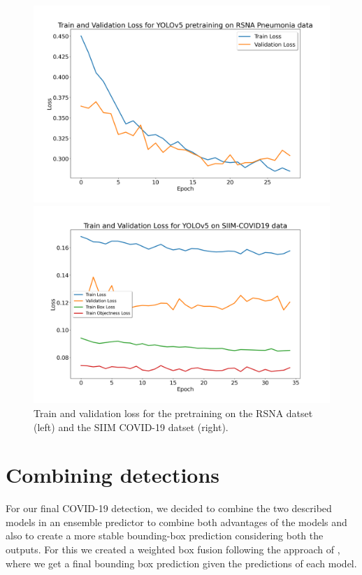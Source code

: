 \begin{figure}[h!]
	\centering
	\begin{minipage}{.5\textwidth}
		\centering
		\includegraphics[width=\linewidth]{img/loss_yolo_30.png}
	\end{minipage}%
	\begin{minipage}{0.5\textwidth}
		\centering
		\includegraphics[width=\linewidth]{img/loss_yolo_35_siim_final.png}
	\end{minipage}
\caption{Train and validation loss for the pretraining on the RSNA datset (left) and the SIIM COVID-19 datset (right).}
\label{fig:yolo_losses}
\end{figure}


\newpage
\section{Combining detections}\label{section:combining_detections}
For our final COVID-19 detection, we decided to combine the two described models in an ensemble predictor to combine both advantages of the models and also to create a more stable bounding-box prediction considering both the outputs. For this we created a weighted box fusion following the approach of \citeauthor{weightedBoxFusion} \autocite{weightedBoxFusion}, where we get a final bounding box prediction given the predictions of each model.

